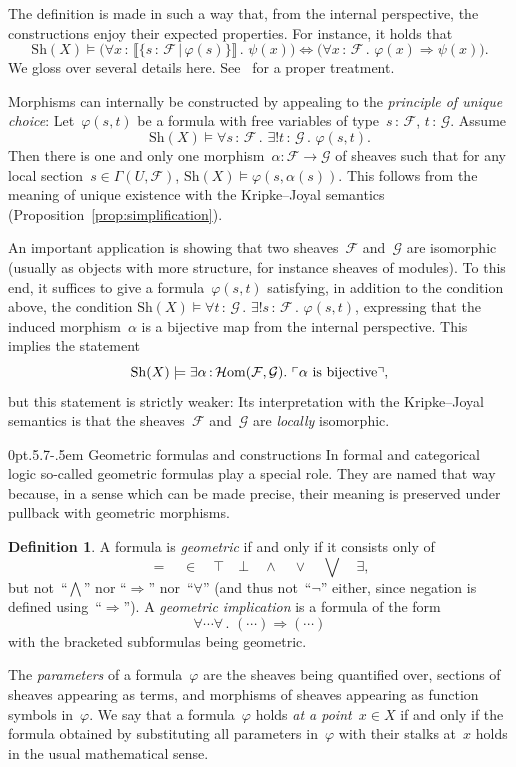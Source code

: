 \documentclass[10pt,reqno,a4paper]{amsbook}
\makeatletter
\theoremstyle{definition}
\newtheorem{defn}{Definition}[section]
\theoremstyle{plain}
\theoremstyle{remark}
\newcommand{\F}{\mathcal{F}}
\renewcommand{\G}{\mathcal{G}}
\newcommand{\HOM}{\mathcal{H}\mathrm{om}}
\newcommand{\Sh}{\mathrm{Sh}}
\newcommand{\?}{\,{:}\,}
\renewcommand{\_}{\mathpunct{.}\,}
\newcommand{\speak}[1]{\ulcorner\text{\textnormal{#1}}\urcorner}
\newcommand{\brak}[1]{{\llbracket{#1}\rrbracket}}
\def\subsection{\@startsection{subsection}{2}%
  {0pt}{.5\linespacing\@plus.7\linespacing}{-.5em}%
  {\normalfont\bfseries}}
\makeatother
\begin{document}
The definition is made in such a way that, from the internal perspective, the
constructions enjoy their expected properties. For instance, it holds that
\[ \Sh(X) \models
  \bigl(\forall x\?\brak{\{s\?\F \,|\, \varphi(s)\}}\_ \psi(x)\bigr)
  \Longleftrightarrow
  \bigl(\forall x\?\F\_ \varphi(x) \Rightarrow \psi(x)\bigr). \]
We gloss over several details here. See~\cite[Section~D4.1]{johnstone:elephant} for
a proper treatment.

Morphisms can internally be constructed by appealing to the \emph{principle of
unique choice}: Let~$\varphi(s,t)$ be a formula with free variables of
type~$s\?\F$, $t\?\G$. Assume
\[ \Sh(X) \models \forall s\?\F\_ \exists!t\?\G\_ \varphi(s,t). \]
Then there is one and only one morphism~$\alpha : \F \to \G$ of sheaves such
that for any local section~$s \in \Gamma(U,\F)$, $\Sh(X) \models
\varphi(s,\alpha(s))$. This follows from the meaning of unique existence with
the Kripke--Joyal semantics (Proposition~\ref{prop:simplification}).

An important application is showing that two sheaves~$\F$ and~$\G$ are
isomorphic (usually as objects with more structure, for instance sheaves of
modules). To this end, it suffices to give a formula~$\varphi(s,t)$ satisfying,
in addition to the condition above, the condition
$\Sh(X) \models \forall t\?\G\_ \exists! s\?\F\_ \varphi(s,t)$,
expressing that the induced morphism~$\alpha$ is a bijective map from the
internal perspective. This implies the statement
\[ \Sh(X) \models \exists \alpha\?\HOM(\F,\G)\_ \speak{$\alpha$ is bijective},
\]
but this statement is strictly weaker: Its interpretation with the
Kripke--Joyal semantics is that the sheaves~$\F$ and~$\G$ are \emph{locally}
isomorphic.


\subsection{Geometric formulas and
constructions}\label{sect:geometric-formulas-and-constructions}
In formal and categorical logic so-called geometric formulas play a
special role. They are named that way because, in a sense which can be made
precise, their meaning is preserved under pullback with geometric morphisms.
\begin{defn}\label{defn:geometric-formulas}
A formula is \emph{geometric} if and only if it consists only of
\[ {=} \quad {\in} \quad {\top} \quad {\bot} \quad {\wedge} \quad {\vee} \quad
{\bigvee} \quad {\exists}, \]
but not~``$\bigwedge$'' nor ``$\Rightarrow$'' nor~``$\forall$'' (and thus
not~``$\neg$'' either, since negation is defined using~``$\Rightarrow$'').
A \emph{geometric implication} is a formula of the form
\[ \forall \cdots \forall\_ (\cdots) \Rightarrow (\cdots) \]
with the bracketed subformulas being geometric.
\end{defn}
The \emph{parameters} of a formula~$\varphi$ are the sheaves
being quantified over, sections of sheaves appearing as terms, and morphisms of
sheaves appearing as function symbols in~$\varphi$.
We say that a formula~$\varphi$ holds \emph{at a point~$x \in X$} if and only
if the formula obtained by substituting all parameters in~$\varphi$ with their
stalks at~$x$ holds in the usual mathematical sense.
\end{document}

